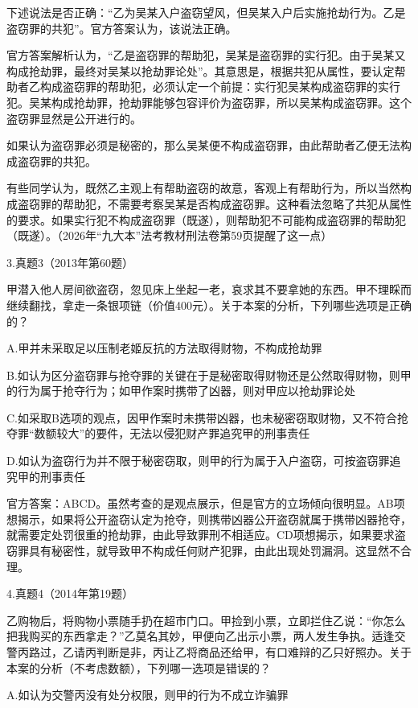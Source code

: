 下述说法是否正确：“乙为吴某入户盗窃望风，但吴某入户后实施抢劫行为。乙是盗窃罪的共犯”。官方答案认为，该说法正确。

官方答案解析认为，“乙是盗窃罪的帮助犯，吴某是盗窃罪的实行犯。由于吴某又构成抢劫罪，最终对吴某以抢劫罪论处”。其意思是，根据共犯从属性，要认定帮助者乙构成盗窃罪的帮助犯，必须认定一个前提：实行犯吴某构成盗窃罪的实行犯。吴某构成抢劫罪，抢劫罪能够包容评价为盗窃罪，所以吴某构成盗窃罪。这个盗窃罪显然是公开进行的。

如果认为盗窃罪必须是秘密的，那么吴某便不构成盗窃罪，由此帮助者乙便无法构成盗窃罪的共犯。

有些同学认为，既然乙主观上有帮助盗窃的故意，客观上有帮助行为，所以当然构成盗窃罪的帮助犯，不需要考察吴某是否构成盗窃罪。这种看法忽略了共犯从属性的要求。如果实行犯不构成盗窃罪（既遂），则帮助犯不可能构成盗窃罪的帮助犯（既遂）。（2026年“九大本”法考教材刑法卷第59页提醒了这一点）

3.真题3（2013年第60题）

甲潜入他人房间欲盗窃，忽见床上坐起一老，哀求其不要拿她的东西。甲不理睬而继续翻找，拿走一条银项链（价值400元）。关于本案的分析，下列哪些选项是正确的？

A.甲并未采取足以压制老姬反抗的方法取得财物，不构成抢劫罪

B.如认为区分盗窃罪与抢夺罪的关键在于是秘密取得财物还是公然取得财物，则甲的行为属于抢夺行为；如甲作案时携带了凶器，则对甲应以抢劫罪论处

C.如采取B选项的观点，因甲作案时未携带凶器，也未秘密窃取财物，又不符合抢夺罪“数额较大”的要件，无法以侵犯财产罪追究甲的刑事责任

D.如认为盗窃行为并不限于秘密窃取，则甲的行为属于入户盗窃，可按盗窃罪追究甲的刑事责任

官方答案：ABCD。虽然考查的是观点展示，但是官方的立场倾向很明显。AB项想揭示，如果将公开盗窃认定为抢夺，则携带凶器公开盗窃就属于携带凶器抢夺，就需要定处罚很重的抢劫罪，由此导致罪刑不相适应。CD项想揭示，如果要求盗窃罪具有秘密性，就导致甲不构成任何财产犯罪，由此出现处罚漏洞。这显然不合理。

4.真题4（2014年第19题）

乙购物后，将购物小票随手扔在超市门口。甲捡到小票，立即拦住乙说：“你怎么把我购买的东西拿走？”乙莫名其妙，甲便向乙出示小票，两人发生争执。适逢交警丙路过，乙请丙判断是非，丙让乙将商品还给甲，有口难辩的乙只好照办。关于本案的分析（不考虑数额），下列哪一选项是错误的？

A.如认为交警丙没有处分权限，则甲的行为不成立诈骗罪

